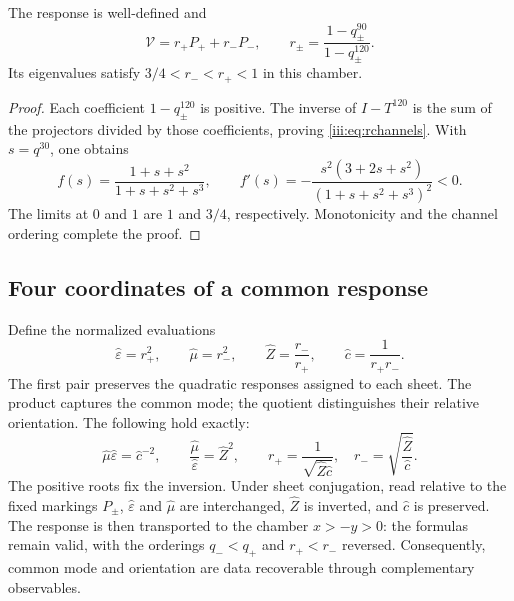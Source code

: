 \begin{proposition}
The response is well-defined and
\begin{equation}
 \mathcal V=r_+P_++r_-P_-,\qquad
 r_\pm=\frac{1-q_\pm^{90}}{1-q_\pm^{120}}.
 \label{iii:eq:rchannels}
\end{equation}
Its eigenvalues satisfy $3/4<r_-<r_+<1$ in this chamber.
\end{proposition}
\begin{proof}
Each coefficient $1-q_\pm^{120}$ is positive. The inverse of $I-T^{120}$
is the sum of the projectors divided by those coefficients, proving
\eqref{iii:eq:rchannels}. With $s=q^{30}$, one obtains
\begin{equation}
 f(s)=\frac{1+s+s^2}{1+s+s^2+s^3},\qquad
 f'(s)=-\frac{s^2(3+2s+s^2)}{(1+s+s^2+s^3)^2}<0.
 \label{iii:eq:monotone}
\end{equation}
The limits at $0$ and $1$ are $1$ and $3/4$, respectively. Monotonicity
and the channel ordering complete the proof.
\end{proof}

\subsection{Four coordinates of a common response}

Define the normalized evaluations
\begin{equation}
 \widehat\varepsilon=r_+^2,\qquad
 \widehat\mu=r_-^2,\qquad
 \widehat Z=\frac{r_-}{r_+},\qquad
 \widehat c=\frac1{r_+r_-}.
 \label{iii:eq:four}
\end{equation}
The first pair preserves the quadratic responses assigned to each sheet.
The product captures the common mode; the quotient distinguishes their relative orientation.
The following hold exactly:
\begin{equation}
 \widehat\mu\widehat\varepsilon=\widehat c^{-2},\qquad
 \frac{\widehat\mu}{\widehat\varepsilon}=\widehat Z^2,
 \qquad
 r_+=\frac1{\sqrt{\widehat Z\widehat c}},\quad
 r_-=\sqrt{\frac{\widehat Z}{\widehat c}}.
 \label{iii:eq:four-identities}
\end{equation}
The positive roots fix the inversion. Under sheet conjugation,
read relative to the fixed markings $P_\pm$,
$\widehat\varepsilon$ and $\widehat\mu$ are interchanged,
$\widehat Z$ is inverted, and $\widehat c$ is preserved. The response is then transported
to the chamber $x>-y>0$: the formulas remain valid, with the orderings
$q_-<q_+$ and $r_+<r_-$ reversed. Consequently, common mode
and orientation are data recoverable through complementary observables.

